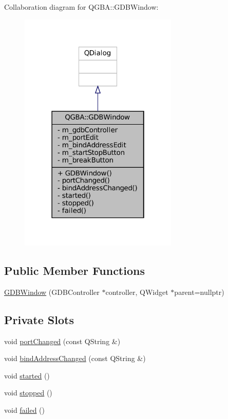 Collaboration diagram for Q\+G\+BA\+:\+:G\+D\+B\+Window\+:
\nopagebreak
\begin{figure}[H]
\begin{center}
\leavevmode
\includegraphics[width=214pt]{class_q_g_b_a_1_1_g_d_b_window__coll__graph}
\end{center}
\end{figure}
\subsection*{Public Member Functions}
\begin{DoxyCompactItemize}
\item 
\mbox{\hyperlink{class_q_g_b_a_1_1_g_d_b_window_af3cbb68393ee6c2e651632197a83e90a}{G\+D\+B\+Window}} (G\+D\+B\+Controller $\ast$controller, Q\+Widget $\ast$parent=nullptr)
\end{DoxyCompactItemize}
\subsection*{Private Slots}
\begin{DoxyCompactItemize}
\item 
void \mbox{\hyperlink{class_q_g_b_a_1_1_g_d_b_window_a1fc6edcafab846d7ab5a34bafa8d36f8}{port\+Changed}} (const Q\+String \&)
\item 
void \mbox{\hyperlink{class_q_g_b_a_1_1_g_d_b_window_afc5665a26276b4a468314710bc96bc8c}{bind\+Address\+Changed}} (const Q\+String \&)
\item 
void \mbox{\hyperlink{class_q_g_b_a_1_1_g_d_b_window_ae3a866cf6616fbf6a7012ac5e8a8abd3}{started}} ()
\item 
void \mbox{\hyperlink{class_q_g_b_a_1_1_g_d_b_window_a7bd93507046abbd87f237a6065a3cd21}{stopped}} ()
\item 
void \mbox{\hyperlink{class_q_g_b_a_1_1_g_d_b_window_a52e687877be0300b9b131bd99a48932b}{failed}} ()
\end{DoxyCompactItemize}
